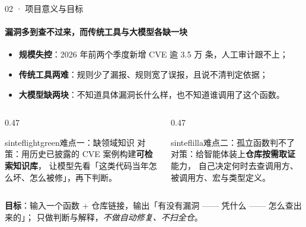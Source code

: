 \documentclass{beamer}
\begin{document}
\begin{frame}{02 · 项目意义与目标}
\framesubtitle{漏洞多到查不过来，而传统工具与大模型各缺一块}
\footnotesize
\begin{itemize}
  \item \textbf{规模失控}：2026 年前两个季度新增 CVE 逾 \alert{3.5 万} 条，人工审计跟不上；
  \item \textbf{传统工具两难}：规则少了漏报、规则宽了误报，且说不清判定依据；
  \item \textbf{大模型缺两块}：不知道具体漏洞长什么样，也不知道谁调用了这个函数。
\end{itemize}

\vspace{0.2em}
\begin{columns}[t]
\begin{column}{0.47\textwidth}
\begin{colorblock}[black]{sinteflightgreen}{难点一：缺领域知识}
\scriptsize
对策：用历史已披露的 CVE 案例构建\textbf{可检索知识库}，
让模型先看「这类代码当年怎么坏、怎么被修」，再下判断。
\end{colorblock}
\end{column}
\begin{column}{0.47\textwidth}
\begin{colorblock}[white]{sinteflilla}{难点二：孤立函数判不了}
\scriptsize
对策：给智能体装上\textbf{仓库按需取证}能力，
自己决定何时去查调用方、被调用方、宏与类型定义。
\end{colorblock}
\end{column}
\end{columns}

\vspace{0.2em}
{\scriptsize \textbf{目标}：输入一个函数 + 仓库链接，输出「有没有漏洞 —— 凭什么 —— 怎么查出来的」；
只做判断与解释，\emph{不做自动修复、不扫全仓}。}
\end{frame}
\end{document}
